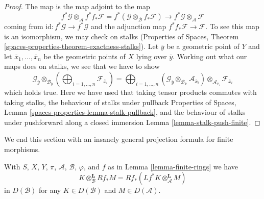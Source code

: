 \begin{proof}
The map is the map adjoint to the map
$$
f^*\mathcal{G} \otimes_\mathcal{A}
f^* f_*\mathcal{F} =
f^*(\mathcal{G} \otimes_\mathcal{B} f_*\mathcal{F})
\longrightarrow
f^*\mathcal{G} \otimes_\mathcal{A} \mathcal{F}
$$
coming from $\text{id} : f^*\mathcal{G} \to f^*\mathcal{G}$
and the adjunction map $f^* f_*\mathcal{F} \to \mathcal{F}$.
To see this map is an isomorphism, we may check on stalks
(Properties of Spaces, Theorem
\ref{spaces-properties-theorem-exactness-stalks}).
Let $\overline{y}$ be a geometric point of $Y$ and
let $\overline{x}_1, \ldots, \overline{x}_n$ be the geometric
points of $X$ lying over $\overline{y}$.
Working out what our maps does on stalks, we see that we
have to show
$$
\mathcal{G}_{\overline{y}}
\otimes_{\mathcal{B}_{\overline{y}}}
\left(
\bigoplus\nolimits_{i = 1, \ldots, n} \mathcal{F}_{\overline{x}_i}
\right) =
\bigoplus\nolimits_{i = 1, \ldots, n}
(\mathcal{G}_{\overline{y}}
\otimes_{\mathcal{B}_{\overline{x}}}
\mathcal{A}_{\overline{x}_i}) \otimes_{\mathcal{A}_{\overline{x}_i}}
\mathcal{F}_{\overline{x}_i}
$$
which holds true. Here we have used that
taking tensor products commutes with taking stalks, the
behaviour of stalks under pullback
Properties of Spaces, Lemma \ref{spaces-properties-lemma-stalk-pullback}, and
the behaviour of stalks under pushforward along a closed immersion
Lemma \ref{lemma-stalk-push-finite}.
\end{proof}

\noindent
We end this section with an insanely general projection formula
for finite morphisms.

\begin{lemma}
\label{lemma-projection-formula-finite}
With $S$, $X$, $Y$, $\pi$, $\mathcal{A}$, $\mathcal{B}$, $\varphi$, and $f$
as in Lemma \ref{lemma-finite-rings} we have
$$
K \otimes_\mathcal{B}^\mathbf{L} Rf_*M =
Rf_*(Lf^*K \otimes_\mathcal{A}^\mathbf{L} M)
$$
in $D(\mathcal{B})$ for any $K \in D(\mathcal{B})$ and
$M \in D(\mathcal{A})$.
\end{lemma}

